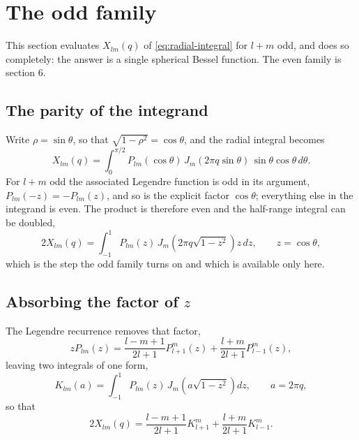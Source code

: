 
\section{The odd family}
\label{sec:odd}

This section evaluates $X_{lm}(q)$ of \eqref{eq:radial-integral} for $l+m$ odd, and
does so completely: the answer is a single spherical Bessel function.  The even
family is section 6.

\subsection{The parity of the integrand}
\label{sec:odd-parity}

Write $\rho = \sin\theta$, so that $\sqrt{1-\rho^2} = \cos\theta$, and the radial
integral becomes
\begin{equation}
  X_{lm}(q) = \int_0^{\pi/2} P_{lm}(\cos\theta)\,
  J_m(2\pi q\sin\theta)\,\sin\theta\cos\theta\,d\theta .
  \label{eq:radial-in-theta}
\end{equation}
For $l+m$ odd the associated Legendre function is odd in its argument,
$P_{lm}(-z) = -P_{lm}(z)$, and so is the explicit factor $\cos\theta$; everything
else in the integrand is even.  The product is therefore even and the half-range
integral can be doubled,
\begin{equation}
  2X_{lm}(q) = \int_{-1}^{1} P_{lm}(z)\, J_m\!\left(2\pi q\sqrt{1-z^2}\right)
  z\,dz , \qquad z = \cos\theta ,
  \label{eq:doubled}
\end{equation}
which is the step the odd family turns on and which is available only here.

\subsection{Absorbing the factor of \texorpdfstring{$z$}{z}}
\label{sec:odd-recurrence}

The Legendre recurrence \citep[12.92]{arfken} removes that factor,
\begin{equation}
  z P_{lm}(z) = \frac{l-m+1}{2l+1} P_{l+1}^m(z)
  + \frac{l+m}{2l+1} P_{l-1}^m(z) ,
  \label{eq:legendre-recurrence}
\end{equation}
leaving two integrals of one form,
\begin{equation}
  K_{lm}(a) = \int_{-1}^{1} P_{lm}(z)\, J_m\!\left(a\sqrt{1-z^2}\right) dz ,
  \qquad a = 2\pi q ,
  \label{eq:K}
\end{equation}
so that
\begin{equation}
  2X_{lm}(q) = \frac{l-m+1}{2l+1} K_{l+1}^m
  + \frac{l+m}{2l+1} K_{l-1}^m .
  \label{eq:K-combination}
\end{equation}

